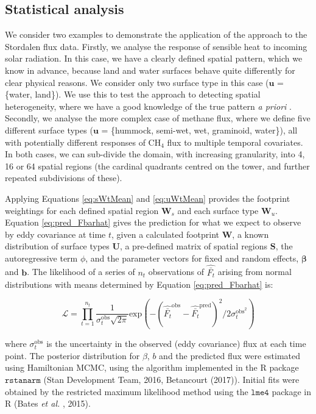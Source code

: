 \subsection{Statistical analysis}\label{statistical-analysis}

We consider two examples to demonstrate the application of the approach
to the Stordalen flux data. Firstly, we analyse the response of sensible
heat to incoming solar radiation. In this case, we have a clearly
defined spatial pattern, which we know in advance, because land and
water surfaces behave quite differently for clear physical reasons. We
consider only two surface type in this case (\(\mathbf{u}\) = \{water,
land\}). We use this to test the approach to detecting spatial
heterogeneity, where we have a good knowledge of the true pattern
\emph{a priori} . Secondly, we analyse the more complex case of methane
flux, where we define five different surface types (\(\mathbf{u}\) =
\{hummock, semi-wet, wet, graminoid, water\}), all with potentially
different responses of CH\(_4\) flux to multiple temporal covariates. In
both cases, we can sub-divide the domain, with increasing granularity,
into 4, 16 or 64 spatial regions (the cardinal quadrants centred on the
tower, and further repeated subdivisions of these).

Applying Equations \ref{eq:sWtMean} and \ref{eq:uWtMean} provides the
footprint weightings for each defined spatial region \(\mathbf{W}_{s}\)
and each surface type \(\mathbf{W}_{u}\). Equation \ref{eq:pred_Fbarhat}
gives the prediction for what we expect to observe by eddy covariance at
time \(t\), given a calculated footprint \(\mathbf{W}\), a known
distribution of surface types \(\mathbf{U}\), a pre-defined matrix of
spatial regions \(\mathbf{S}\), the autoregressive term \(\phi\), and
the parameter vectors for fixed and random effects,
\(\boldsymbol{\beta}\) and \(\mathbf{b}\). The likelihood of a series of
\(n_t\) observations of \(\widehat{\bar{F_t}}\) arising from normal
distributions with means determined by Equation \ref{eq:pred_Fbarhat}
is:

\begin{equation}
 \mathcal{L} = \prod_{t=1}^{n_t} \frac{1}{\sigma_{t}^\mathrm{obs} \sqrt{2\pi}} \mathrm{exp}(-(\widehat{\bar{F_t}}^\mathrm{obs} - \widehat{\bar{F_t}}^\mathrm{pred})^2/2 \sigma_{t}^{\mathrm{obs}^2})

\end{equation}

where \(\sigma_{t}^{\mathrm{obs}}\) is the uncertainty in the observed
(eddy covariance) flux at each time point. The posterior distribution
for \(\beta\), \(b\) and the predicted flux were estimated using
Hamiltonian MCMC, using the algorithm implemented in the R package
\(\texttt{rstanarm}\) (Stan Development Team, 2016, Betancourt (2017)).
Initial fits were obtained by the restricted maximum likelihood method
using the \(\texttt{lme4}\) package in R (Bates \emph{et al.} , 2015).

